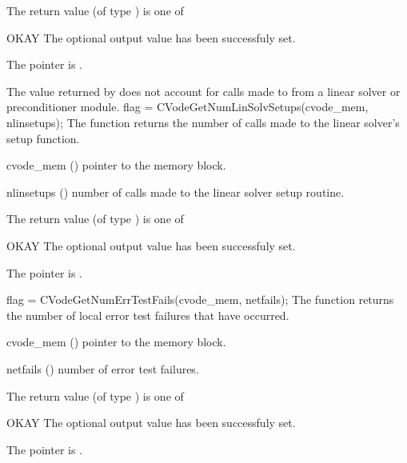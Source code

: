 {
  The return value  (of type ) is one of
  \begin{args}
  \item[OKAY] 
    The optional output value has been successfuly set.
  \item[\Id{CVG\_NO\_MEM}]
    The  pointer is .
  \end{args}
}
{
  The  value returned by  does not
  account for calls made to  from a linear solver or preconditioner 
  module. 
}
{
  flag = CVodeGetNumLinSolvSetups(cvode\_mem, nlinsetups);
}
{
  The function  returns the
  number of calls made to the linear solver's setup function.
}
{
  \begin{args}[nlinsetups]
  \item[cvode\_mem] ()
    pointer to the {\cvode} memory block.
  \item[nlinsetups] ()
    number of calls made to the linear solver setup routine.
  \end{args}
}
{
  The return value  (of type ) is one of
  \begin{args}
  \item[OKAY] 
    The optional output value has been successfuly set.
  \item[\Id{CVG\_NO\_MEM}]
    The  pointer is .
  \end{args}
}
{}
{
  flag = CVodeGetNumErrTestFails(cvode\_mem, netfails);
}
{
  The function  returns the
  number of local error test failures that have occurred.
}
{
  \begin{args}
  \item[cvode\_mem] ()
    pointer to the {\cvode} memory block.
  \item[netfails] ()
    number of error test failures.
  \end{args}
}
{
  The return value  (of type ) is one of
  \begin{args}
  \item[OKAY] 
    The optional output value has been successfuly set.
  \item[\Id{CVG\_NO\_MEM}]
    The  pointer is .
  \end{args}
}
{}
